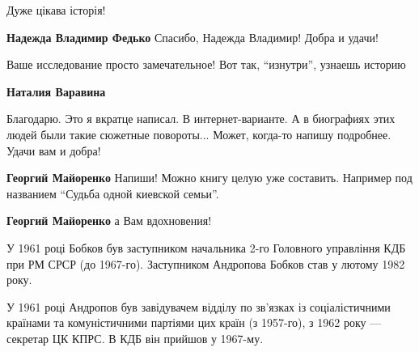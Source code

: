 \begin{itemize}
Дуже цікава історія!

\textbf{Надежда Владимир Федько} Спасибо, Надежда Владимир! Добра и удачи!

Ваше исследование просто замечательное! Вот так, \enquote{изнутри}, узнаешь историю

\begin{itemize} %
\textbf{Наталия Варавина} 

Благодарю. Это я вкратце написал. В интернет-варианте. А в биографиях этих
людей были такие сюжетные повороты... Может, когда-то напишу подробнее. Удачи
вам и добра!

\textbf{Георгий Майоренко} Напиши! Можно книгу целую уже составить. Например под названием \enquote{Судьба одной киевской семьи}.

\textbf{Георгий Майоренко} а Вам вдохновения!
\end{itemize} %


У 1961 році Бобков був заступником начальника 2-го Головного управління КДБ при
РМ СРСР (до 1967-го). Заступником Андропова Бобков став у лютому 1982 року.

У 1961 році Андропов був завідувачем відділу по зв'язках із соціалістичними
країнами та комуністичними партіями цих країн (з 1957-го), з 1962 року —
секретар ЦК КПРС. В КДБ він прийшов у 1967-му.

\end{itemize} %
